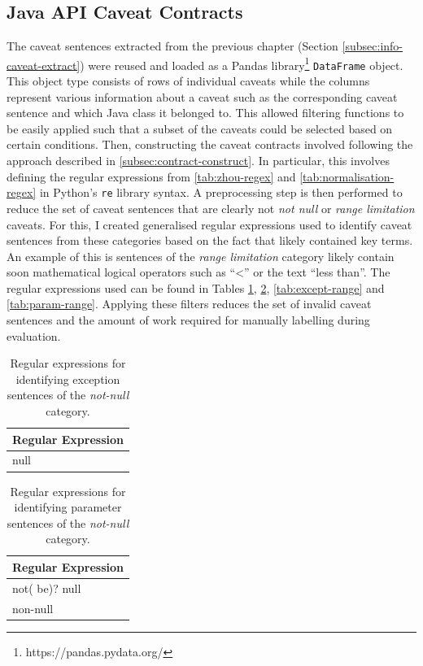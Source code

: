 \subsection{Java API Caveat Contracts}
\label{subsec:contract-caveat-contracts}
The caveat sentences extracted from the previous chapter (Section \ref{subsec:info-caveat-extract}) were reused and loaded as a Pandas library\footnote{https://pandas.pydata.org/} \lstinline{DataFrame} object. This object type consists of rows of individual caveats while the columns represent various information about a caveat such as the corresponding caveat sentence and which Java class it belonged to. This allowed filtering functions to be easily applied such that a subset of the caveats could be selected based on certain conditions. Then, constructing the caveat contracts involved following the approach described in \ref{subsec:contract-construct}. In particular, this involves defining the regular expressions from \ref{tab:zhou-regex} and \ref{tab:normalisation-regex} in Python's \lstinline{re} library syntax. A preprocessing step is then performed to reduce the set of caveat sentences that are clearly not \textit{not null} or \textit{range limitation} caveats. For this, I created generalised regular expressions used to identify caveat sentences from these categories based on the fact that likely contained key terms. An example of this is sentences of the \textit{range limitation} category likely contain soon mathematical logical operators such as ``<'' or the text ``less than''. The regular expressions used can be found in Tables \ref{tab:except-null}, \ref{tab:param-null}, \ref{tab:except-range} and \ref{tab:param-range}. Applying these filters reduces the set of invalid caveat sentences and the amount of work required for manually labelling during evaluation.

\begin{table}[h]
	\centering
	\begin{tabular}{|l|}
		\hline
		\textbf{Regular Expression} \\ \hline
		null \\ \hline
	\end{tabular}
	\caption{Regular expressions for identifying exception sentences of the \textit{not-null} category.}
	\label{tab:except-null}
\end{table}

\begin{table}[h]
	\centering
	\begin{tabular}{|l|}
		\hline
		\textbf{Regular Expression} \\ \hline
		not( be)? null \\ \hline
		non-null \\ \hline
	\end{tabular}
	\caption{Regular expressions for identifying parameter sentences of the \textit{not-null} category.}
	\label{tab:param-null}
\end{table}


